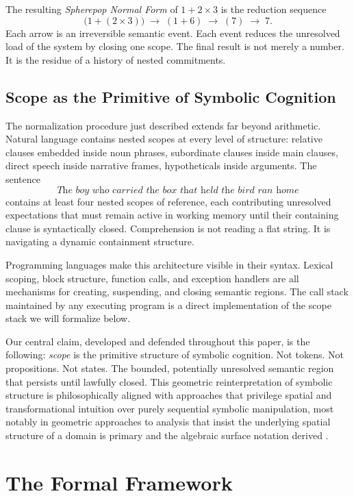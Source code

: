 \documentclass[12pt, a4paper]{article}
\theoremstyle{plain}
\theoremstyle{definition}
\theoremstyle{remark}
\begin{document}
The resulting \emph{Spherepop Normal Form} of $1 + 2 \times 3$ is the
reduction sequence
\[
  \bigl(1 + (2 \times 3)\bigr)
  \;\longrightarrow\;
  (1 + 6)
  \;\longrightarrow\;
  (7)
  \;\longrightarrow\;
  7.
\]
Each arrow is an irreversible semantic event. Each event reduces the
unresolved load of the system by closing one scope. The final result is not
merely a number. It is the residue of a history of nested commitments.

\subsection{Scope as the Primitive of Symbolic Cognition}

The normalization procedure just described extends far beyond arithmetic.
Natural language contains nested scopes at every level of structure: relative
clauses embedded inside noun phrases, subordinate clauses inside main clauses,
direct speech inside narrative frames, hypotheticals inside arguments. The
sentence
\[
  \textit{The boy who carried the box that held the bird ran home}
\]
contains at least four nested scopes of reference, each contributing
unresolved expectations that must remain active in working memory until their
containing clause is syntactically closed. Comprehension is not reading a
flat string. It is navigating a dynamic containment structure.

Programming languages make this architecture visible in their syntax.
Lexical scoping, block structure, function calls, and exception handlers are
all mechanisms for creating, suspending, and closing semantic regions. The
call stack maintained by any executing program is a direct implementation of
the scope stack we will formalize below.

Our central claim, developed and defended throughout this paper, is the
following: \emph{scope} is the primitive structure of symbolic cognition.
Not tokens. Not propositions. Not states. The bounded, potentially unresolved
semantic region that persists until lawfully closed. This geometric
reinterpretation of symbolic structure is philosophically aligned with
approaches that privilege spatial and transformational intuition over purely
sequential symbolic manipulation, most notably in geometric approaches to
analysis that insist the underlying spatial structure of a domain is
primary and the algebraic surface notation derived \cite{Needham1997}.


\section{The Formal Framework}
\end{document}
